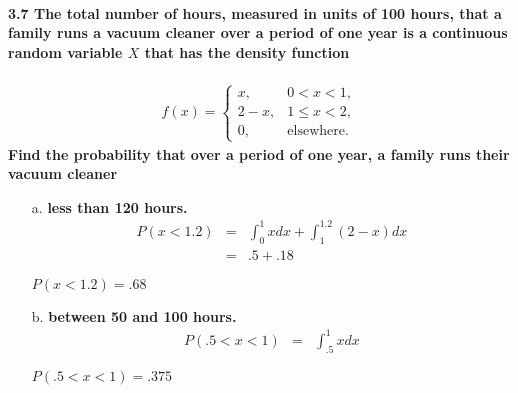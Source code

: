 \documentclass{article}
\begin{document}
\pagebreak

\paragraph{3.7 The total number of hours, measured in units of 100 hours,
that a family runs a vacuum cleaner over a period of one year is a
continuous random variable $X$ that has the density function}
\begin{eqnarray*}
  f(x) = \left\{ \begin{array}{ll}
  	x, & 0 < x < 1,\\
	2-x, & 1 \leq x < 2,\\
	0, & \mbox{elsewhere.}
  \end{array}\right.
\end{eqnarray*}
\textbf{Find the probability that over a period of one year, a family 
runs their vacuum cleaner}
\begin{enumerate}
\item[a.] \textbf{less than 120 hours.}\\
\begin{eqnarray*}
  P(x < 1.2) & = & \int_0^1 xdx + \int_1^{1.2} (2-x)dx\\
             & = & .5 + .18
\end{eqnarray*}
\begin{center}
$\boxed{P(x <1.2) = .68}$
\end{center}

\item[b.] \textbf{between 50 and 100 hours.}\\
\begin{eqnarray*}
  P(.5 < x < 1) & = & \int_{.5}^1 xdx
\end{eqnarray*}
\begin{center}
$\boxed{P(.5 < x < 1) = .375}$
\end{center}
\end{enumerate}
\end{document}
